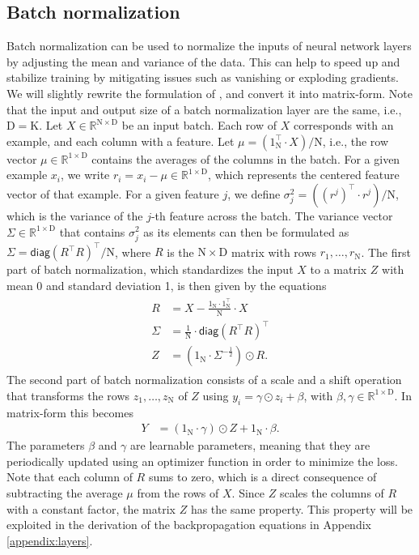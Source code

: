 \documentclass[twoside,11pt]{article}
\newcommand{\const}[1]{\ensuremath{\mathrm{#1}}} %
\newcommand{\func}[1]{\ensuremath{\textsf{#1}}} %
\newcommand{\Reals}{\mathbb{R}}
\begin{document}
\subsection{Batch normalization}
Batch normalization \citep{DBLP:conf/icml/IoffeS15} can be used to normalize the inputs of neural network layers by adjusting the mean and variance of the data. This can help to speed up and stabilize training by mitigating issues such as vanishing or exploding gradients.
We will slightly rewrite the formulation of \citet{DBLP:conf/icml/IoffeS15}, and convert it into matrix-form. Note that the input and output size of a batch normalization layer are the same, i.e., $\const{D} = \const{K}$. Let $X \in \Reals^{\const{N} \times \const{D}}$ be an input batch.
Each row of $X$ corresponds with an example, and each column with a feature. Let $\mu = (1_\const{N}^\top \cdot X) / \const{N}$, i.e., the row vector $\mu \in \Reals^{1 \times \const{D}}$ contains the averages of the columns in the batch. For a given example $x_i$, we write $r_i = x_i - \mu \in \Reals^{1 \times \const{D}}$, which represents the centered feature vector of that example. For a given feature $j$, we define $\sigma_j^2 = ((r^j)^\top \cdot r^j) / \const{N}$, which is the variance of the $j$-th feature across the batch.
The variance vector $\Sigma \in \Reals^{1 \times \const{D}}$ that contains $\sigma_j^2$ as its elements can then be formulated as $\Sigma = \func{diag}(R^\top R)^\top/\const{N}$, where $R$ is the $\const{N} \times \const{D}$ matrix with rows $r_1, \ldots, r_\const{N}$.
The first part of batch normalization, which standardizes the input $X$ to a matrix $Z$ with mean 0 and standard deviation 1, is then given by the equations
\begin{align}
\begin{split}
R &= X - \frac{1_\const{N} \cdot 1_\const{N}^\top}{\const{N}} \cdot X
\\
\Sigma &= \frac{1}{\const{N}} \cdot \func{diag}(R^\top R)^\top
\\
Z &= (1_\const{N} \cdot \Sigma^{-\frac{1}{2}}) \odot R.
\end{split}
\end{align}
The second part of batch normalization consists of a scale and a shift operation that transforms the rows $z_1, \ldots, z_\const{N}$ of $Z$ using $y_i = \gamma \odot z_i + \beta$, with $\beta, \gamma \in \Reals^{1 \times \const{D}}$. In matrix-form this becomes
\begin{align}
Y &= (1_\const{N} \cdot \gamma) \odot Z + 1_\const{N} \cdot \beta.
\end{align}
The parameters $\beta$ and $\gamma$ are learnable parameters, meaning that they are periodically updated using an optimizer function in order to minimize the loss. Note that each column of $R$ sums to zero, which is a direct consequence of subtracting the average $\mu$ from the rows of $X$. Since $Z$ scales the columns of $R$ with a constant factor, the matrix $Z$ has the same property. This property will be exploited in the derivation of the backpropagation equations in Appendix \ref{appendix:layers}.
\end{document}
